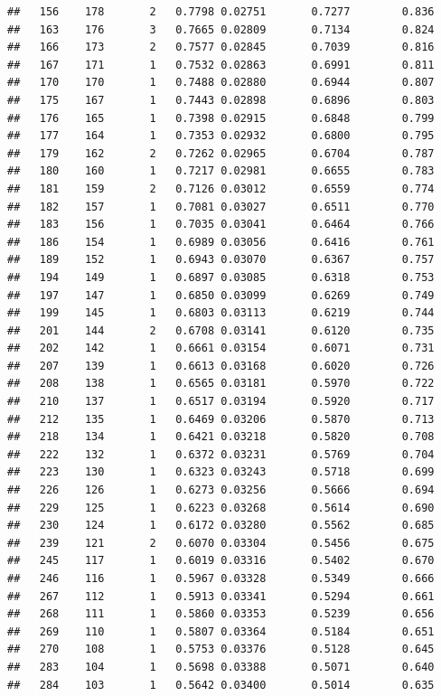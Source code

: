 \documentclass[
]{article}
\begin{document}
\begin{verbatim}
##   156    178       2   0.7798 0.02751       0.7277        0.836
##   163    176       3   0.7665 0.02809       0.7134        0.824
##   166    173       2   0.7577 0.02845       0.7039        0.816
##   167    171       1   0.7532 0.02863       0.6991        0.811
##   170    170       1   0.7488 0.02880       0.6944        0.807
##   175    167       1   0.7443 0.02898       0.6896        0.803
##   176    165       1   0.7398 0.02915       0.6848        0.799
##   177    164       1   0.7353 0.02932       0.6800        0.795
##   179    162       2   0.7262 0.02965       0.6704        0.787
##   180    160       1   0.7217 0.02981       0.6655        0.783
##   181    159       2   0.7126 0.03012       0.6559        0.774
##   182    157       1   0.7081 0.03027       0.6511        0.770
##   183    156       1   0.7035 0.03041       0.6464        0.766
##   186    154       1   0.6989 0.03056       0.6416        0.761
##   189    152       1   0.6943 0.03070       0.6367        0.757
##   194    149       1   0.6897 0.03085       0.6318        0.753
##   197    147       1   0.6850 0.03099       0.6269        0.749
##   199    145       1   0.6803 0.03113       0.6219        0.744
##   201    144       2   0.6708 0.03141       0.6120        0.735
##   202    142       1   0.6661 0.03154       0.6071        0.731
##   207    139       1   0.6613 0.03168       0.6020        0.726
##   208    138       1   0.6565 0.03181       0.5970        0.722
##   210    137       1   0.6517 0.03194       0.5920        0.717
##   212    135       1   0.6469 0.03206       0.5870        0.713
##   218    134       1   0.6421 0.03218       0.5820        0.708
##   222    132       1   0.6372 0.03231       0.5769        0.704
##   223    130       1   0.6323 0.03243       0.5718        0.699
##   226    126       1   0.6273 0.03256       0.5666        0.694
##   229    125       1   0.6223 0.03268       0.5614        0.690
##   230    124       1   0.6172 0.03280       0.5562        0.685
##   239    121       2   0.6070 0.03304       0.5456        0.675
##   245    117       1   0.6019 0.03316       0.5402        0.670
##   246    116       1   0.5967 0.03328       0.5349        0.666
##   267    112       1   0.5913 0.03341       0.5294        0.661
##   268    111       1   0.5860 0.03353       0.5239        0.656
##   269    110       1   0.5807 0.03364       0.5184        0.651
##   270    108       1   0.5753 0.03376       0.5128        0.645
##   283    104       1   0.5698 0.03388       0.5071        0.640
##   284    103       1   0.5642 0.03400       0.5014        0.635

\end{verbatim}
\end{document}
